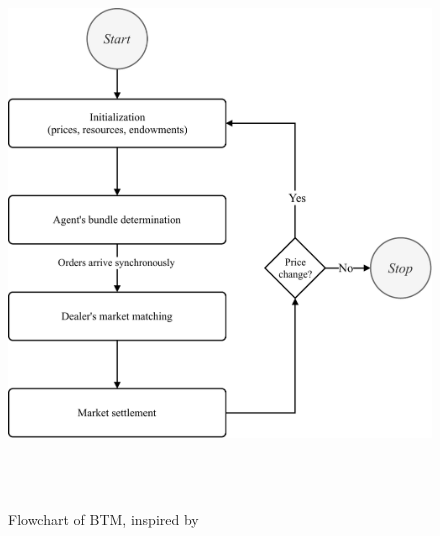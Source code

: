 \begin{figure}[htbp]
        \centering
        \includegraphics[width=0.59\linewidth]{./figures/btm_flowchart.pdf}
        \caption{Flowchart of BTM, inspired by \protect{}}
        \label{figure:btm_flowchart}
\end{figure}


\clearpage